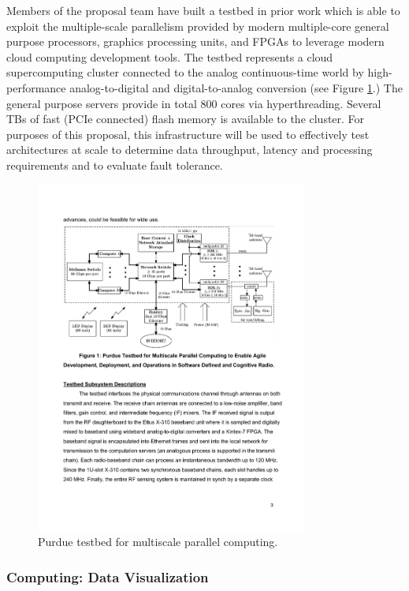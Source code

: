 \documentclass[11pt]{article}
\begin{document}
Members of the proposal team have built a testbed in prior work which is able to exploit the multiple-scale parallelism 
provided by modern multiple-core general purpose processors, graphics processing units, and FPGAs to leverage modern 
cloud computing development tools. The testbed represents a cloud supercomputing cluster connected to the analog 
continuous-time world by high-performance analog-to-digital and digital-to-analog conversion (see Figure \ref{fg:IoT-testbed}.) The general 
purpose servers provide in total 800 cores via hyperthreading. Several TBs of fast (PCIe connected) flash memory is 
available to the cluster.  
For purposes of this proposal, this infrastructure will be used to effectively test architectures at scale to determine 
data throughput, latency and processing requirements and to evaluate fault tolerance.

\begin{figure} 
\centerline{
\includegraphics[width = 0.8\textwidth]{CloudRadioFigure}
}
\caption{Purdue testbed for multiscale parallel computing.} 
\label{fg:IoT-testbed}
\end{figure} 

\subsubsection{Computing: Data Visualization}   
\end{document}
